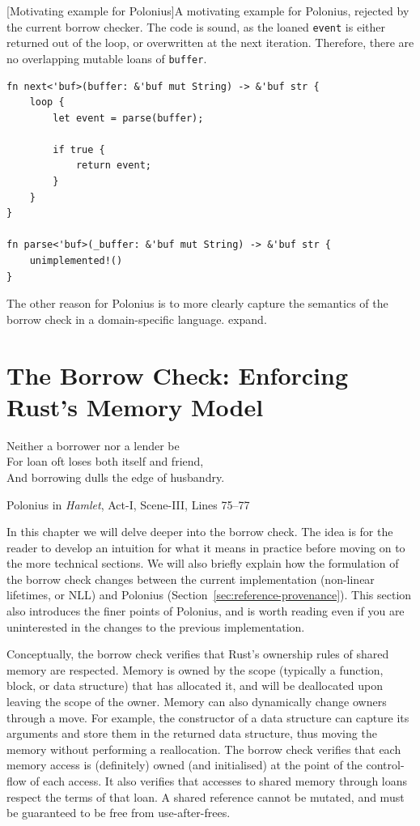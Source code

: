 \documentclass[11pt,a4paper,twoside,openany]{report}
\newcommand{\fixme}[1] {{\color{red}#1}}
\newenvironment{sourcecode}{\captionsetup{type=listing}}{}
\newcommand{\InRust}[1]{\texttt{#1}}
\begin{document}
\begin{sourcecode}
  [Motivating example for Polonius]{A motivating example for
    Polonius, rejected by the current borrow checker. The code is sound, as the
    loaned \InRust{event} is either returned out of the loop, or overwritten at
    the next iteration. Therefore, there are no overlapping mutable loans of
    \InRust{buffer}.~\cite{issue-51132}}\label{lst:motivating-example}
\begin{verbatim}
fn next<'buf>(buffer: &'buf mut String) -> &'buf str {
    loop {
        let event = parse(buffer);

        if true {
            return event;
        }
    }
}

fn parse<'buf>(_buffer: &'buf mut String) -> &'buf str {
    unimplemented!()
}
\end{verbatim}
\end{sourcecode}

The other reason for Polonius is to more clearly capture the semantics of the
borrow check in a domain-specific language. \fixme{expand.}

\chapter{The Borrow Check: Enforcing Rust's Memory
  Model}\label{cha:borrowing-rules}

\epigraph{Neither a borrower nor a lender be\\
  For loan oft loses both itself and friend,\\
  And borrowing dulls the edge of husbandry.}%
{Polonius in \textit{Hamlet}, Act-I, Scene-III, Lines 75--77}

In this chapter we will delve deeper into the borrow check. The idea is for the
reader to develop an intuition for what it means in practice before moving on to
the more technical sections. We will also briefly explain how the formulation of
the borrow check changes between the current implementation (non-linear
lifetimes, or NLL) and Polonius (Section~\ref{sec:reference-provenance}). This
section also introduces the finer points of Polonius, and is worth reading even
if you are uninterested in the changes to the previous implementation.

Conceptually, the borrow check verifies that Rust's ownership rules of shared
memory are respected. Memory is owned by the scope (typically a function, block,
or data structure) that has allocated it, and will be deallocated upon leaving
the scope of the owner. Memory can also dynamically change owners through a
move. For example, the constructor of a data structure can capture its arguments
and store them in the returned data structure, thus moving the memory without
performing a reallocation. The borrow check verifies that each memory access is
(definitely) owned (and initialised) at the point of the control-flow of each
access. It also verifies that accesses to shared memory through loans respect
the terms of that loan. A shared reference cannot be mutated, and must be
guaranteed to be free from use-after-frees.
\end{document}
